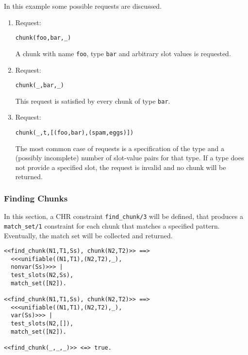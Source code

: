 \begin{example}
In this example some possible requests are discussed.

\begin{enumerate}
 \item Request:
\begin{lstlisting}
chunk(foo,bar,_)        
\end{lstlisting}

A chunk with name \lstinline|foo|, type \lstinline|bar| and arbitrary slot values is requested.

 \item Request:
\begin{lstlisting}
chunk(_,bar,_)        
\end{lstlisting}

This request is satisfied by every chunk of type \lstinline|bar|.

 \item Request:
\begin{lstlisting}
chunk(_,t,[(foo,bar),(spam,eggs)])        
\end{lstlisting}

The most common case of requests is a specification of the type and a (possibly incomplete) number of slot-value pairs for that type. If a type does not provide a specified slot, the request is invalid and no chunk will be returned.

\end{enumerate}

\end{example}

\subsubsection{Finding Chunks}

In this section, a CHR constraint \lstinline|find_chunk/3| will be defined, that produces a \lstinline|match_set/1| constraint for each chunk that matches a specified pattern. Eventually, the match set will be collected and returned.

\begin{lstlisting}
<<find_chunk(N1,T1,Ss), chunk(N2,T2)>> ==> 
  <<<unifiable((N1,T1),(N2,T2),_), 
  nonvar(Ss)>>> | 
  test_slots(N2,Ss), 
  match_set([N2]).
  
<<find_chunk(N1,T1,Ss), chunk(N2,T2)>> ==> 
  <<<unifiable((N1,T1),(N2,T2),_), 
  var(Ss)>>> | 
  test_slots(N2,[]), 
  match_set([N2]).

<<find_chunk(_,_,_)>> <=> true.
\end{lstlisting}

